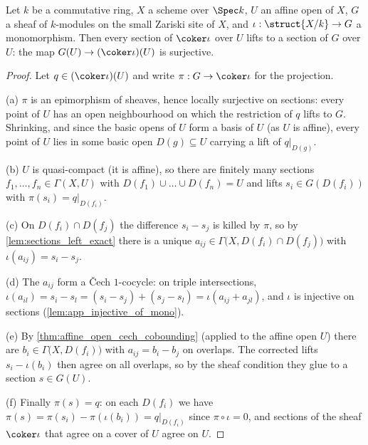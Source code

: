 \begin{theorem}
  \label{thm:cokernel_app_surjective_affine_open}
  \leanok
  Let \(k\) be a commutative ring, \(X\) a scheme over \(\Spec k\), \(U\) an affine open of
  \(X\), \(G\) a sheaf of \(k\)-modules on the small Zariski site of \(X\), and
  \(\iota : \struct{X/k} \to G\) a monomorphism. Then every section of
  \(\coker \iota\) over \(U\) lifts to a section of \(G\) over \(U\): the map
  \(G(U) \to (\coker \iota)(U)\) is surjective.
\end{theorem}
\begin{proof}
  \leanok
  Let \(q \in (\coker \iota)(U)\) and write \(\pi : G \to \coker \iota\) for the projection.

  (a) \(\pi\) is an epimorphism of sheaves, hence locally surjective on sections: every point
  of \(U\) has an open neighbourhood on which the restriction of \(q\) lifts to \(G\).
  Shrinking, and since the basic opens of \(U\) form a basis of \(U\) (as \(U\) is affine),
  every point of \(U\) lies in some basic open \(D(g) \subseteq U\) carrying a lift of
  \(q|_{D(g)}\).

  (b) \(U\) is quasi-compact (it is affine), so there are finitely many sections
  \(f_1, \dots, f_n \in \Gamma(X, U)\) with \(D(f_1) \cup \dots \cup D(f_n) = U\) and lifts
  \(s_i \in G(D(f_i))\) with \(\pi(s_i) = q|_{D(f_i)}\).

  (c) On \(D(f_i) \cap D(f_j)\) the difference \(s_i - s_j\) is killed by \(\pi\), so by
  \ref{lem:sections_left_exact} there is a unique
  \(a_{ij} \in \Gamma\bigl(X, D(f_i) \cap D(f_j)\bigr)\) with
  \(\iota(a_{ij}) = s_i - s_j\).

  (d) The \(a_{ij}\) form a \v{C}ech \(1\)-cocycle: on triple intersections,
  \(\iota(a_{il}) = s_i - s_l = (s_i - s_j) + (s_j - s_l) = \iota(a_{ij} + a_{jl})\), and
  \(\iota\) is injective on sections (\ref{lem:app_injective_of_mono}).

  (e) By \ref{thm:affine_open_cech_cobounding} (applied to the affine open \(U\)) there are
  \(b_i \in \Gamma\bigl(X, D(f_i)\bigr)\) with \(a_{ij} = b_i - b_j\) on overlaps. The
  corrected lifts \(s_i - \iota(b_i)\) then agree on all overlaps, so by the sheaf condition
  they glue to a section \(s \in G(U)\).

  (f) Finally \(\pi(s) = q\): on each \(D(f_i)\) we have
  \(\pi(s) = \pi(s_i) - \pi(\iota(b_i)) = q|_{D(f_i)}\) since \(\pi \circ \iota = 0\), and
  sections of the sheaf \(\coker \iota\) that agree on a cover of \(U\) agree on \(U\).
\end{proof}

